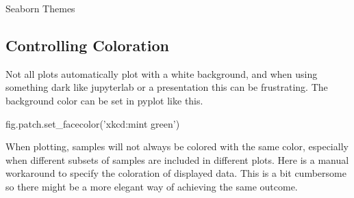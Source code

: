 \documentclass[]{book}
\newenvironment{Shaded}{\begin{snugshade}}{\end{snugshade}}
\newcommand{\StringTok}[1]{\textcolor[rgb]{0.31,0.60,0.02}{#1}}
\newcommand{\NormalTok}[1]{#1}
\begin{document}
Seaborn Themes

\begin{Shaded}
\end{Shaded}

\begin{Shaded}
\end{Shaded}

\subsection{Controlling Coloration}\label{controlling-coloration}

Not all plots automatically plot with a white background, and when using
something dark like jupyterlab or a presentation this can be
frustrating. The background color can be set in pyplot like this.

\begin{Shaded}
\begin{Highlighting}[]
\NormalTok{fig.patch.set_facecolor(}\StringTok{'xkcd:mint green'}\NormalTok{)}
\end{Highlighting}
\end{Shaded}

When plotting, samples will not always be colored with the same color,
especially when different subsets of samples are included in different
plots. Here is a manual workaround to specify the coloration of
displayed data. This is a bit cumbersome so there might be a more
elegant way of achieving the same outcome.
\end{document}
